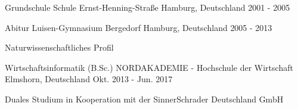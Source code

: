 

\begin{cventries}

  \cventry
    {Grundschule} %
    {Schule Ernst-Henning-Straße} %
    {Hamburg, Deutschland} %
    {2001 - 2005} %
    {}

  \cventry
    {Abitur} %
    {Luisen-Gymnasium Bergedorf} %
    {Hamburg, Deutschland} %
    {2005 - 2013} %
    {
      \begin{cvitems} %
        \item {Naturwissenschaftliches Profil}
      \end{cvitems}
    }

  \cventry
    {Wirtschaftsinformatik (B.Sc.)} %
    {NORDAKADEMIE - Hochschule der Wirtschaft} %
    {Elmshorn, Deutschland} %
    {Okt. 2013 - Jun. 2017} %
    {
      \begin{cvitems} %
        \item {Duales Studium in Kooperation mit der SinnerSchrader Deutschland GmbH}
      \end{cvitems}
    }

\end{cventries}
